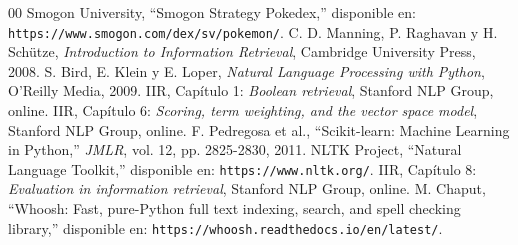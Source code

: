 \documentclass[conference,a4paper]{IEEEtran}
\begin{document}
\begin{thebibliography}{00}
 Smogon University, ``Smogon Strategy Pokedex,'' disponible en: \texttt{https://www.smogon.com/dex/sv/pokemon/}.
 C. D. Manning, P. Raghavan y H. Schütze, \emph{Introduction to Information Retrieval}, Cambridge University Press, 2008.
 S. Bird, E. Klein y E. Loper, \emph{Natural Language Processing with Python}, O'Reilly Media, 2009.
 IIR, Capítulo 1: \emph{Boolean retrieval}, Stanford NLP Group, online.
 IIR, Capítulo 6: \emph{Scoring, term weighting, and the vector space model}, Stanford NLP Group, online.
 F. Pedregosa et al., ``Scikit-learn: Machine Learning in Python,'' \emph{JMLR}, vol. 12, pp. 2825-2830, 2011.
 NLTK Project, ``Natural Language Toolkit,'' disponible en: \texttt{https://www.nltk.org/}.
 IIR, Capítulo 8: \emph{Evaluation in information retrieval}, Stanford NLP Group, online.
 M. Chaput, ``Whoosh: Fast, pure-Python full text indexing, search, and spell checking library,'' disponible en: \texttt{https://whoosh.readthedocs.io/en/latest/}.
\end{thebibliography}
\end{document}
